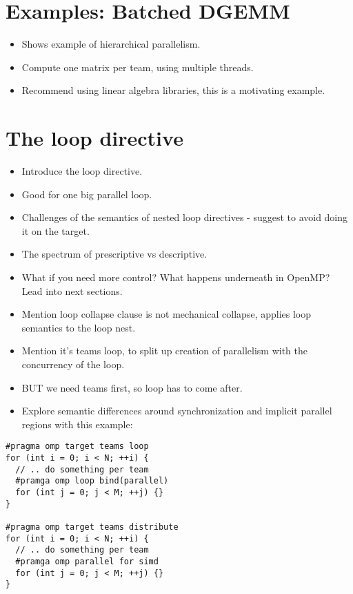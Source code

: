 \section{Examples: Batched DGEMM}
\begin{itemize}
  \item Shows example of hierarchical parallelism.
  \item Compute one matrix per team, using multiple threads.
  \item Recommend using linear algebra libraries, this is a motivating example.
\end{itemize}

\section{The loop directive}
\label{sec:loop}
\begin{itemize}
  \item Introduce the loop directive.
  \item Good for one big parallel loop.
  \item Challenges of the semantics of nested loop directives - suggest to avoid doing it on the target.
  \item The spectrum of prescriptive vs descriptive.
  \item What if you need more control? What happens underneath in OpenMP? Lead into next sections.
  \item Mention loop collapse clause is not mechanical collapse, applies loop semantics to the loop nest.
  \item Mention it's teams loop, to split up creation of parallelism with the concurrency of the loop.
  \item BUT we need teams first, so loop has to come after.
  \item Explore semantic differences around synchronization and implicit parallel regions with this example:
\end{itemize}

\begin{Verbatim}
#pragma omp target teams loop
for (int i = 0; i < N; ++i) {
  // .. do something per team
  #pramga omp loop bind(parallel)
  for (int j = 0; j < M; ++j) {}
}

#pragma omp target teams distribute
for (int i = 0; i < N; ++i) {
  // .. do something per team
  #pramga omp parallel for simd
  for (int j = 0; j < M; ++j) {}
}
\end{Verbatim}


